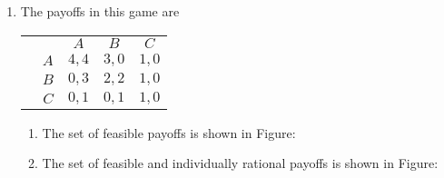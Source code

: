 \documentclass[11pt]{article}
\begin{document}
\begin{enumerate}
	\item The payoffs in this game are
	\begin{table}[!htbp]
		\centering
		\setlength{\extrarowheight}{2pt}
		\begin{tabular}{cc|c|c|c|}
			& \multicolumn{1}{c}{} & \multicolumn{1}{c}{$A$}  & \multicolumn{1}{c}{$B$} & \multicolumn{1}{c}{$ C $} \\\cline{3-5}
			& $A$ & $ 4,4 $ & $ 3,0 $ & $ 1,0 $\\\cline{3-5}
			& $B$ & $ 0,3 $ & $ 2,2 $ & $ 1,0 $\\\cline{3-5}
			& $C$ & $ 0,1 $ & $ 0,1 $ & $ 1,0 $\\\cline{3-5}
		\end{tabular}
	\end{table}
	\begin{enumerate}
		\item The set of feasible payoffs is shown in Figure:
		
		\item The set of feasible and individually rational payoffs is shown in Figure:
	\end{enumerate}
\end{enumerate}
\end{document}
